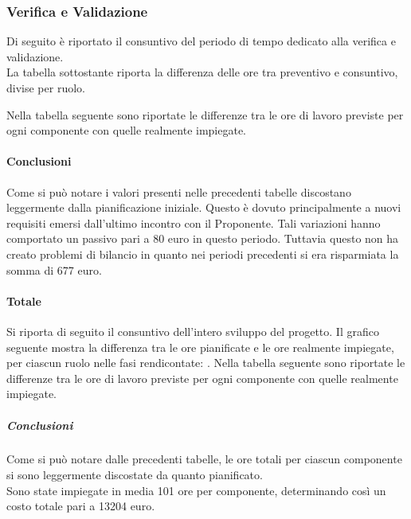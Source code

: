 \subsubsection{Verifica e Validazione}
Di seguito è riportato il consuntivo del periodo di tempo dedicato alla verifica e validazione.\\
La tabella sottostante riporta la differenza delle ore tra preventivo e consuntivo, divise per ruolo.


Nella tabella seguente sono riportate le differenze tra le ore di lavoro previste per ogni componente con quelle realmente impiegate.


\paragraph{Conclusioni}
Come si può notare i valori presenti nelle precedenti tabelle discostano leggermente dalla pianificazione iniziale. Questo è dovuto principalmente a nuovi requisiti emersi dall'ultimo incontro con il Proponente.
Tali variazioni hanno comportato un passivo pari a 80 euro in questo periodo. Tuttavia questo non ha creato problemi di bilancio in quanto nei periodi precedenti si era risparmiata la somma di 677 euro.  

\paragraph{Totale}
Si riporta di seguito il consuntivo dell'intero sviluppo del progetto.
Il grafico seguente mostra la differenza tra le ore pianificate e le ore realmente impiegate, per ciascun ruolo nelle fasi rendicontate: .
Nella tabella seguente sono riportate le differenze tra le ore di lavoro previste per ogni componente con quelle realmente impiegate.



\subparagraph{Conclusioni}
Come si può notare dalle precedenti tabelle, le ore totali per ciascun componente si sono leggermente discostate da quanto pianificato.\\
Sono state impiegate in media 101 ore per componente, determinando così un costo totale pari a 13204 euro.



